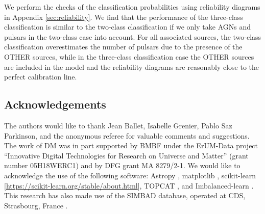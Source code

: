 \documentclass[referee]{aa} %
\begin{document}
We perform the checks of the classification probabilities using reliability diagrams in Appendix \ref{sec:reliability}. 
We find that the performance of the three-class classification is similar to the two-class classification if we only take AGNs and pulsars in the two-class case into account. For all associated sources, the two-class classification overestimates the number of pulsars due to the presence of the
OTHER sources, while in the three-class classification case the OTHER sources are included in the model and the reliability diagrams are reasonably close to the perfect calibration line.

\subsection*{Acknowledgements}

The authors would like to thank Jean Ballet, Isabelle Grenier, Pablo Saz Parkinson, and the anonymous referee for valuable comments and suggestions.
The work of DM was in part supported by BMBF under the ErUM-Data project ``Innovative Digital Technologies for Research on Universe and Matter'' (grant number 05H18WERC1) and by DFG grant MA 8279/2-1.
We would like to acknowledge the use of the following software:
Astropy \citep[\url{http://www.astropy.org},][]{2013A&A...558A..33A}, 
matplotlib \citep{Hunter:2007}, 
scikit-learn [\url{https://scikit-learn.org/stable/about.html}], 
TOPCAT \citep{2005ASPC..347...29T}, and Imbalanced-learn \cite{JMLR:v18:16-365}.
This research has also made use of the SIMBAD database,
operated at CDS, Strasbourg, France \citep{2000A&AS..143....9W}.

  
\end{document}
